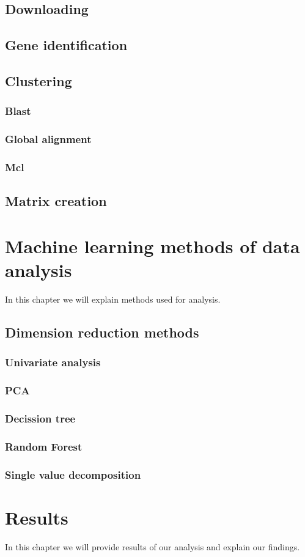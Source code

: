 \section{Downloading}
\section{Gene identification}
\section{Clustering}
\subsection{Blast}
\subsection{Global alignment}
\subsection{Mcl}
\section{Matrix creation}

\chapter{Machine learning methods of data analysis}
In this chapter we will explain methods used for analysis.

\section{Dimension reduction methods}
\subsection{Univariate analysis}
\subsection{PCA}
\subsection{Decission tree}
\subsection{Random Forest}
\subsection{Single value decomposition}


\chapter{Results}
In this chapter we will provide results of our analysis and explain our findings.
